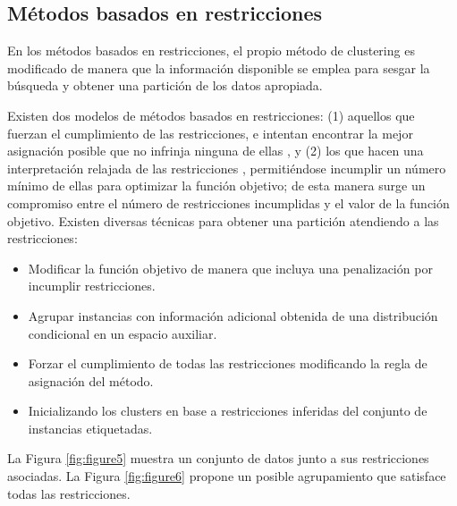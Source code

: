 \subsection{Métodos basados en restricciones}

En los métodos basados en restricciones, el propio método de clustering es modificado de manera que la información disponible se emplea para sesgar la búsqueda y obtener una partición de los datos apropiada.

Existen dos modelos de métodos basados en restricciones: (1) aquellos que fuerzan el cumplimiento de las restricciones, e intentan encontrar la mejor asignación posible que no infrinja ninguna de ellas \cite{Wagstaff:2001b}\cite{DavidsonRavi:2005b}, y (2) los que hacen una interpretación relajada de las restricciones \cite{Basu:2004}\cite{Seagal:2003}\cite{DavidsonRavi:2005a}\cite{Law:2005}, permitiéndose incumplir un número mínimo de ellas para optimizar la función objetivo; de esta manera surge un compromiso entre el número de restricciones incumplidas y el valor de la función objetivo. Existen diversas técnicas para obtener una partición atendiendo a las restricciones:

\begin{itemize}
	
	\item Modificar la función objetivo de manera que incluya una penalización por incumplir restricciones. \cite{Demiriz:1999} \cite{DavidsonRavi:2005a}
	
	\item Agrupar instancias con información adicional obtenida de una distribución condicional en un espacio auxiliar. \cite{SinkkonenKaski:2000}
	
	\item Forzar el cumplimiento de todas las restricciones modificando la regla de asignación del método. \cite{Wagstaff:2001b}
	
	\item Inicializando los clusters en base a restricciones inferidas del conjunto de instancias etiquetadas.\cite{Basu:2002}
	
\end{itemize}

La Figura \ref{fig:figure5} muestra un conjunto de datos junto a sus restricciones asociadas. La Figura \ref{fig:figure6} propone un posible agrupamiento que satisface todas las restricciones.

